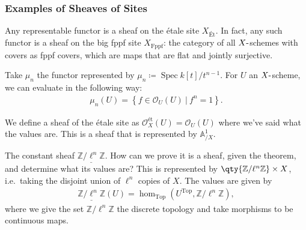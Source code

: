 \hypertarget{examples-of-sheaves-of-sites}{%
\subsubsection{Examples of Sheaves of
Sites}\label{examples-of-sheaves-of-sites}}

\begin{theorem}[?]

Any representable functor is a sheaf on the étale site
\(X_{\text{Ét}}\). In fact, any such functor is a sheaf on the big fppf
site \(X_{\mathrm{\operatorname{Fppf}}}\): the category of all
\(X{\hbox{-}}\)schemes with covers as fppf covers, which are maps that
are flat and jointly surjective.

\end{theorem}

\begin{example}

Take \(\mu_n\) the functor represented by
\(\mu_n \coloneqq\operatorname{Spec}k[t] / t^{n-1}\). For \(U\) an
\(X{\hbox{-}}\)scheme, we can evaluate in the following way:
\begin{align*}  
\mu_n(U) = \left\{{f\in {\mathcal{O}}_U(U) {~\mathrel{\Big|}~}f^n = 1}\right\}
.\end{align*}

\end{example}

\begin{example}[?]

We define a sheaf of the étale site as
\({\mathcal{O}}^{\text{ét}}_X(U) = {\mathcal{O}}_U(U)\) where we've said
what the values are. This is a sheaf that is represented by
\({\mathbb{A}}^1_{/X}\).

\end{example}

\begin{example}[?]

The constant sheaf \(\underline{\mathbb{Z}/\ell^n\mathbb{Z}}\). How can
we prove it is a sheaf, given the theorem, and determine what its values
are? This is represented by
\(\qty{\mathbb{Z}/\ell^n\mathbb{Z}} \times X\), i.e.~taking the disjoint
union of \(\ell^n\) copies of \(X\). The values are given by
\begin{align*}  
\underline{\mathbb{Z}/\ell^n\mathbb{Z}}(U) =  \hom_{{\operatorname{Top}}}(U^{{\operatorname{Top}}}, \mathbb{Z}/\ell^n\mathbb{Z})
,\end{align*}
where we give the set \(\mathbb{Z}/\ell^n\mathbb{Z}\) the discrete
topology and take morphisms to be continuous maps.

\end{example}

